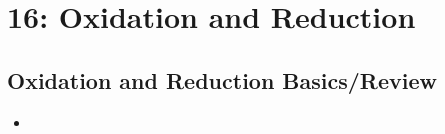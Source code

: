 \chapter{16: Oxidation and Reduction}\label{16: Oxidation and Reduction}
\section{Oxidation and Reduction Basics/Review}\label{Oxidation and Reduction Basics/Review}
\begin{itemize}
    \item 
\end{itemize}
